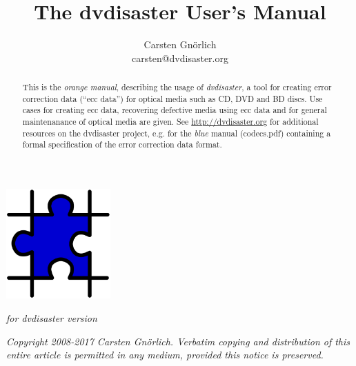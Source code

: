 \documentclass[12pt,a4paper,twoside]{article}
\newcommand{\paperversion}{{\em for dvdisaster version \projectversion}}
\begin{document}
\pagecolor{lightorange}
\title{The dvdisaster User's Manual}
\author{Carsten Gnörlich\\carsten@dvdisaster.org}
\date{}
\maketitle
\thispagestyle{empty}

\centerline{\includegraphics[width=40mm]{figures/puzzle.pdf}}

\begin{center}
\paperversion
\end{center}

\bigskip

\begin{abstract}
This is the {\em orange manual}, describing the usage of {\em dvdisaster}, a tool for
creating error correction data (``ecc data'') 
for optical media  such as CD, DVD and BD discs. 
Use cases for creating ecc data, recovering defective media
using ecc data and for general maintenanance of optical 
media are given. 
See \url{http://dvdisaster.org}  for additional resources on
the dvdisaster project, e.g. for the {\em blue} manual (codecs.pdf)
containing a formal specification of the error correction data format.
\end{abstract}

\vfill
\begin{center}
{\em 
Copyright 2008-2017 Carsten Gnörlich.
Verbatim copying and distribution of this entire article is permitted in any medium, 
provided this notice is preserved.}
\end{center}

\newpage
\nopagecolor


\tableofcontents
\newpage


\newpage


\newpage


\newpage


\newpage


\newpage


\newpage


\newpage



\label{LastPage}\label{missing}
\end{document}
